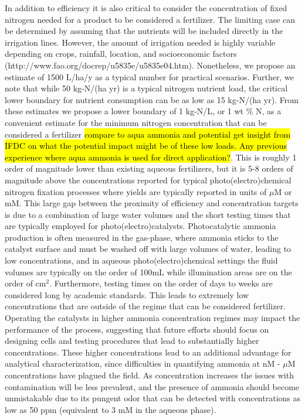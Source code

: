 In addition to efficiency it is also critical to consider the concentration of fixed nitrogen needed for a product to be considered a fertilizer. The limiting case can be determined by assuming that the nutrients will be included directly in the irrigation lines. However, the amount of irrigation needed is highly variable depending on crops, rainfall, location, and socioeconomic factors (http://www.fao.org/docrep/u5835e/u5835e04.htm). Nonetheless, we propose an estimate of 1500 L/ha/y as a typical number for practical scenarios. Further, we note that while 50 kg-N/(ha yr) is a typical nitrogen nutrient load, the critical lower boundary for nutrient consumption can be as low as 15 kg-N/(ha yr). From these estimates we propose a lower boundary of 1 kg-N/L, or 1 wt \% N, as a convenient estimate for the minimum nitrogen concentration that can be considered a fertilizer \hl{compare to aqua ammonia and potential get insight from IFDC on what the potential impact might be of these low loads. Any previous experience where aqua ammonia is used for direct application?}. This is roughly 1 order of magnitude lower than existing aqueous fertilizers, but it is 5-8 orders of magnitude above the concentrations reported for typical photo(electro)chemical nitrogen fixation processes where yields are typically reported in units of $\mu$M or mM. This large gap between the proximity of efficiency and concentration targets is due to a combination of large water volumes and the short testing times that are typically employed for photo(electro)catalysts. Photocatalytic ammonia production is often measured in the gas-phase, where ammonia sticks to the catalyst surface and must be washed off with large volumes of water, leading to low concentrations, and in aqueous photo(electro)chemical settings the fluid volumes are typically on the order of 100mL while illumination areas are on the order of cm$^2$. Furthermore, testing times on the order of days to weeks are considered long by academic standards. This leads to extremely low concentrations that are outside of the regime that can be considered fertilizer. Operating the catalysts in higher ammonia concentration regimes may impact the performance of the process, suggesting that future efforts should focus on designing cells and testing procedures that lead to substantially higher concentrations. These higher concentrations lead to an additional advantage for analytical characterization, since difficulties in quantifying ammonia at nM - $\mu$M concentrations have plagued the field. As concentration increases the issues with contamination will be less prevalent, and the presence of ammonia should become unmistakable due to its pungent odor that can be detected with concentrations as low as 50 ppm (equivalent to 3 mM in the aqueous phase).

